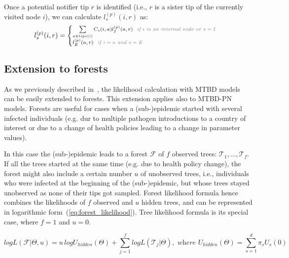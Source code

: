 \documentclass[a4paper,10pt]{article}
\begin{document}
Once a potential notifier tip $r$ is identified (i.e., $r$ is a sister tip of the currently visited node $i$), we can calculate $l_s^{(p)}(i, r)$ as:
\begin{equation}
\scriptsize 
l_s^{(p)}(i, r) = 
\begin{cases}
\sum\limits_{a \in tips(i)}C_s(i, a) l_I^{(p)}(a, r)\textit{\color{gray}~~if $i$ is an internal node or $s=I$}\\
l_E^{(p)}(a, r)\textit{\color{gray}~~if $i=a$ and $s=E$}
\end{cases}
\end{equation}

\subsection{Extension to forests}

As we previously described in~\citep{zhukovaFastAccurateMaximumLikelihood2022}, the likelihood calculation with MTBD models can be easily extended to forests. This extension applies also to MTBD-PN models. Forests are useful for cases when a (sub-)epidemic started with several infected individuals (e.g. dur to multiple pathogen introductions to a country of interest or due to a change of health policies leading to a change in parameter values).

In this case the (sub-)epidemic leads to a forest $\mathscr{F}$ of $f$ observed trees: $\mathscr{T}_1, \ldots, \mathscr{T}_f$. If all the trees started at the same time (e.g. due to health policy change), the forest might also include a certain number $u$ of unobserved trees, i.e., individuals who were infected at the beginning of the (sub-)epidemic, but whose trees stayed unobserved  as none of their tips got sampled.
Forest likelihood formula hence combines the likelihoods of $f$ observed and $u$ hidden trees, and can be represented in logarithmic form~(\ref{eq:forest_likelihood}). Tree likelihood formula %
is its special case, where $f=1$ and $u=0$. 


\begin{equation}
logL(\mathscr{F}|\Theta,u)=u\,logU_{hidden}(\Theta) + \sum\limits_{j=1}^f logL(\mathscr{T}_j|\Theta), \textit{ where } U_{hidden}(\Theta)=\sum\limits_{s=1}^{d}\pi_s U_s(0) \label{eq:forest_likelihood} 
\end{equation}
\end{document}
